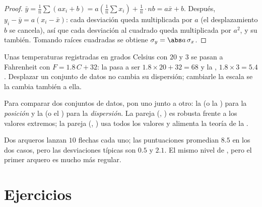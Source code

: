 \begin{proof}
$\bar y = \frac1n \sum (a x_i + b) = a\left(\frac1n\sum x_i\right) +
\frac1n \cdot nb = a\bar x + b$. Después,
$y_i - \bar y = a(x_i - \bar x)$: cada desviación queda multiplicada por
$a$ (el desplazamiento $b$ se cancela), así que cada desviación al
cuadrado queda multiplicada por $a^2$, y su  también. Tomando raíces
cuadradas se obtiene $\sigma_y = \abs a\,\sigma_x$.
\end{proof}

\begin{example}
Unas temperaturas registradas en grados Celsius con  $20$ y
 $3$ se pasan a Fahrenheit con $F = 1.8\,C + 32$: la
 pasa a ser $1.8 \times 20 + 32 = 68$ y la ,
$1.8 \times 3 = 5.4$. Desplazar un conjunto de datos no cambia su
dispersión; cambiarle la escala se la cambia también a ella.
\end{example}

\begin{method}\label{met:g11:stat:compare}
Para comparar dos conjuntos de datos, pon uno junto a otro: la  (o la
) para la \emph{posición} y la  (o el ) para la \emph{dispersión}. La pareja (, ) es robusta frente a los valores extremos; la pareja
(, ) usa todos los valores y alimenta la teoría de
la .
\end{method}

\begin{example}
Dos arqueros lanzan $10$ flechas cada uno; las puntuaciones promedian
$8.5$ en los dos casos, pero las desviaciones típicas son $0.5$ y $2.1$.
El mismo nivel de , pero el primer arquero es mucho más regular.
\end{example}

\section{Ejercicios}

